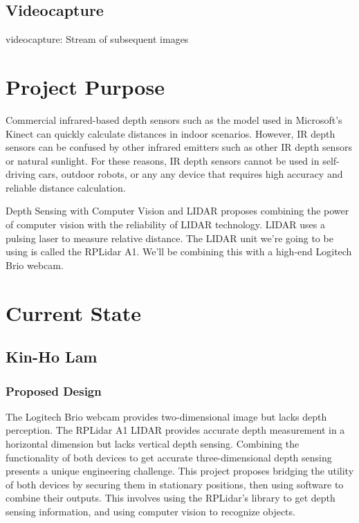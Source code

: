 \documentclass[onecolumn, draftclsnofoot,10pt, compsoc]{IEEEtran}
\begin{document}
\begin{singlespace}
		\subsection{Videocapture}\label{def:videocapture}
		videocapture: Stream of subsequent images
		
		
		
	\section{Project Purpose}
		Commercial infrared-based depth sensors such as the model used in Microsoft's Kinect can quickly calculate distances in indoor scenarios.
		However, IR depth sensors can be confused by other infrared emitters such as other IR depth sensors or natural sunlight.
		For these reasons, IR depth sensors cannot be used in self-driving cars, outdoor robots, or any any device that requires high accuracy and reliable distance calculation.

		Depth Sensing with Computer Vision and LIDAR proposes combining the power of computer vision with the reliability of LIDAR technology.
		LIDAR uses a pulsing laser to measure relative distance.
		The LIDAR unit we're going to be using is called the RPLidar A1.
		We'll be combining this with a high-end Logitech Brio webcam.

	\section{Current State}

	\subsection{Kin-Ho Lam}
		\subsubsection{Proposed Design}
			The Logitech Brio webcam provides two-dimensional image but lacks depth perception.
			The RPLidar A1 LIDAR provides accurate depth measurement in a horizontal dimension but lacks vertical depth sensing.
			Combining the functionality of both devices to get accurate three-dimensional depth sensing presents a unique engineering challenge.
			This project proposes bridging the utility of both devices by securing them in stationary positions, then using software to combine their outputs.
			This involves using the RPLidar's library to get depth sensing information, and using computer vision to recognize objects.
			

\end{singlespace}
\end{document}
